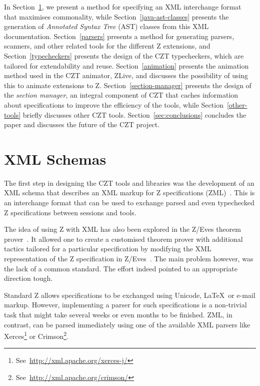 \documentclass{llncs}
\begin{document}
  In Section~\ref{xml-schemas}, we present a method for specifying an
  XML interchange format that maximises commonality, while
  Section~\ref{java-ast-classes} presents the generation of
  \emph{Annotated Syntax Tree} (AST) classes from this XML
  documentation. Section~\ref{parsers} presents a method for
  generating parsers, scanners, and other related tools for the
  different Z extensions, and Section~\ref{typecheckers} presents
  the design of the CZT typecheckers, which are tailored for
  extendability and reuse. Section~\ref{animation} presents the
  animation method used in the CZT animator, ZLive, and discusses the
  possibility of using this to animate extensions to
  Z. Section~\ref{section-manager} presents the design of the {\em
  section manager}, an integral component of CZT that caches
  information about specifications to improve the efficiency of the
  tools, while Section~\ref{other-tools} briefly discusses other CZT
  tools. Section~\ref{sec:conclusions} concludes the paper and
  discusses the future of the CZT project.


\section{XML Schemas}
\label{xml-schemas}

  The first step in designing the CZT tools and libraries was the
  development of an XML schema that describes an XML markup for Z
  specifications (ZML)~\cite{UttEA:03}.  This is an interchange format
  that can be used to exchange parsed and even typechecked Z
  specifications between sessions and tools.

  The idea of using Z with XML has also been explored in the
  Z/Eves theorem prover~\cite{tp.tools:zeves.ref}. It allowed one to
  create a customised theorem prover with additional tactics tailored
  for a particular specification by modifying the XML representation
  of the Z specification in Z/Eves~\cite{tp.tools:zeves.api}.
  The main problem however, was the lack of a common standard.
  The effort indeed pointed to an appropriate direction tough.

  Standard Z allows specifications to be exchanged using Unicode,
  \LaTeX\ or e-mail markup.  However, implementing a parser for such
  specifications is a non-trivial task that might take several weeks
  or even months to be finished.  ZML, in contrast, can be parsed
  immediately using one of the available XML parsers like
  Xerces\footnote{See~\url{http://xml.apache.org/xerces-j/}} or
  Crimson\footnote{See~\url{http://xml.apache.org/crimson/}}.
\end{document}
